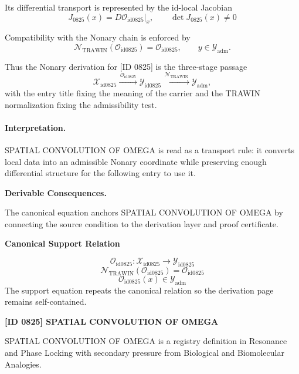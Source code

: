 Its differential transport is represented by the id-local Jacobian\[
J_{0825}(x)=D\mathcal{O}_{\mathrm{id0825}}\big|_x,\qquad \det J_{0825}(x)\neq 0
\]

Compatibility with the Nonary chain is enforced by\[
\mathcal{N}_{\mathrm{TRAWIN}}(\mathcal{O}_{\mathrm{id0825}})=\mathcal{O}_{\mathrm{id0825}},\qquad y\in\mathcal{Y}_{\mathrm{adm}}.
\]

Thus the Nonary derivation for [ID 0825] is the three-stage passage
\[
\mathcal{X}_{\mathrm{id0825}}\xrightarrow{\,\mathcal{O}_{\mathrm{id0825}}\,} \mathcal{Y}_{\mathrm{id0825}}\xrightarrow{\,\mathcal{N}_{\mathrm{TRAWIN}}\,} \mathcal{Y}_{\mathrm{adm}},
\]
with the entry title fixing the meaning of the carrier and the TRAWIN normalization fixing the admissibility test.

\paragraph{Interpretation.} SPATIAL CONVOLUTION OF OMEGA is read as a transport rule: it converts local data into an admissible Nonary coordinate while preserving enough differential structure for the following entry to use it.

\par\vspace{0.35em}
\noindent\textbf{Derivable Consequences.}\quad
\begingroup
\footnotesize
\raggedright
The canonical equation anchors SPATIAL CONVOLUTION OF OMEGA by connecting the source condition to the derivation layer and proof certificate.
\par\endgroup

\noindent\textbf{Canonical Support Relation}\par
\[
\mathcal{O}_{\mathrm{id0825}}:\mathcal{X}_{\mathrm{id0825}}\longrightarrow\mathcal{Y}_{\mathrm{id0825}}
\]
\[
\mathcal{N}_{\mathrm{TRAWIN}}(\mathcal{O}_{\mathrm{id0825}})=\mathcal{O}_{\mathrm{id0825}}
\]
\[
\mathcal{O}_{\mathrm{id0825}}(x)\in\mathcal{Y}_{\mathrm{adm}}
\]
\noindent The support equation repeats the canonical relation so the derivation page remains self-contained.\par

\clearpage
\noindent\textbf{[ID 0825] SPATIAL CONVOLUTION OF OMEGA}\par
\vspace{0.35em}
\begingroup\small
{}
SPATIAL CONVOLUTION OF OMEGA is a registry definition in Resonance and Phase Locking with secondary pressure from Biological and Biomolecular Analogies.


